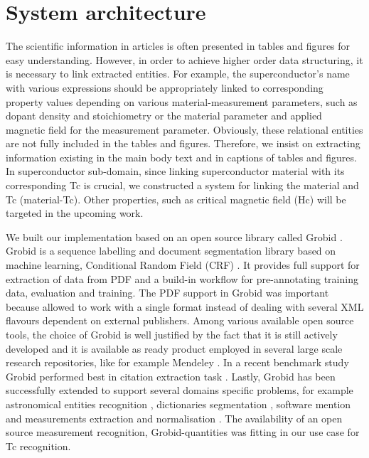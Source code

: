\documentclass{article}[a4]
\begin{document}
\section{System architecture}
\label{sec:architecture}
The scientific information in articles is often presented in tables and figures for easy understanding. However, in order to achieve higher order data structuring, it is necessary to link extracted entities. For example, the superconductor’s name with various expressions should be appropriately linked to corresponding property values depending on various material-measurement parameters, such as dopant density and stoichiometry or the material parameter and applied magnetic field for the measurement parameter. Obviously, these relational entities are not fully included in the tables and figures. Therefore, we insist on extracting information existing in the main body text and in captions of tables and figures. In superconductor sub-domain, since linking superconductor material with its corresponding Tc is crucial, we constructed a system for linking the material and Tc (material-Tc). Other properties, such as critical magnetic field (Hc) will be targeted in the upcoming work.

We built our implementation based on an open source library called Grobid \cite{GROBID}. Grobid is a sequence labelling and document segmentation library based on machine learning, Conditional Random Field (CRF) \cite{lafferty2001conditional}. It provides full support for extraction of data from PDF and a build-in workflow for pre-annotating training data, evaluation and training. The PDF support in Grobid was important because allowed to work with a single format instead of dealing with several XML flavours dependent on external publishers. Among various available open source tools, the choice of Grobid is well justified by the fact that it is still actively developed and it is available as ready product employed in several large scale research repositories, like for example Mendeley \cite{mendeley-extraction}. In a recent benchmark study Grobid performed best in citation extraction task \cite{DBLP:journals/corr/abs-1802-01168}. Lastly, Grobid has been successfully extended to support several domains specific problems, for example astronomical entities recognition \cite{grobid-astro}, dictionaries segmentation \cite{khemakhem2017automatic}, software mention \cite{software-mentions} and measurements extraction and normalisation \cite{grobid-quantities}. The availability of an open source measurement recognition, Grobid-quantities was fitting in our use case for Tc recognition. 
\end{document}
